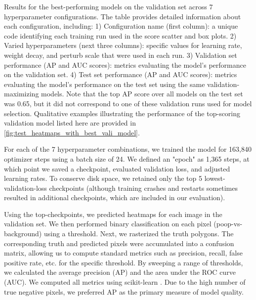 \documentclass[10pt,twocolumn,letterpaper]{article}
\begin{document}
\begin{table*}[t]
{Results for the best-performing models on the validation set across 7 hyperparameter configurations.
The table provides detailed information about each configuration, including:
1) Configuration name (first column): a unique code identifying each training run used in the score scatter and box plots.
2) Varied hyperparameters (next three columns): specific values for learning rate, weight decay, and perturb scale that were used in each run.
3) Validation set performance (AP and AUC scores): metrics evaluating the model's performance on the validation set.
4) Test set performance (AP and AUC scores): metrics evaluating the model's performance on the test set using the same validation-maximizing models.
Note that the top AP score over all models on the test set was 0.65, but it did not correspond to one of these validation runs used for model selection.
Qualitative examples illustrating the performance of the top-scoring validation model listed here are provided in \cref{fig:test_heatmaps_with_best_vali_model}.
}
\label{tab:parameters_and_results}
\end{table*}

\begin{comment}
    SeeAlso:
    ~/code/shitspotter/experiments/run_pixel_eval_pipeline.sh
    python ~/code/shitspotter/dev/poc/estimate_train_resources.py
\end{comment}

For each of the 7 hyperparameter combinations, we trained the model for 163,840 optimizer steps using a
  batch size of 24.
We defined an "epoch" as 1,365 steps, at which point we saved a checkpoint, evaluated validation loss, and
  adjusted learning rates.
To conserve disk space, we retained only the top 5 lowest-validation-loss checkpoints (although training
  crashes and restarts sometimes resulted in additional checkpoints, which are included in our evaluation).

Using the top-checkpoints, we predicted heatmaps for each image in the validation set.
We then performed binary classification on each pixel (poop-vs-background) using a threshold.
Next, we rasterized the truth polygons.
The corresponding truth and predicted pixels were accumulated into a confusion matrix, allowing us to
  compute standard metrics such as precision, recall, false positive rate, etc.
\cite{powers_evaluation_2011} for the specific threshold.
By sweeping a range of thresholds, we calculated the average precision (AP) and the area under the ROC curve
  (AUC).
We computed all metrics using scikit-learn \cite{scikit-learn}.
Due to the high number of true negative pixels, we preferred AP as the primary measure of model quality.
  
\end{document}
